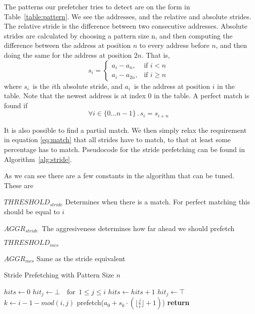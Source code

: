 The patterns our prefetcher tries to detect are on the form in
Table~\ref{table:pattern}.
We see the addresses, and the relative and absolute strides.
The relative stride is the difference between two consecutive
addresses.
Absolute strides are calculated by choosing a pattern size n,
and then computing the difference between the address at position
$n$ to every address before $n$, and then doing the same for the address
at position $2n$.
That is,
\[
	s_i = \begin{cases}
		a_i - a_n,    & \text{if } i  < n \\%
		a_i - a_{2n}, & \text{if } i \geq n %
	\end{cases}
\]
where $s_i$~is the $i$th absolute stride, and $a_i$~is the address at position
$i$ in the table. Note that the newest address is at index 0 in the table. A
perfect match is found if
\begin{equation}
\label{eq:match}
\forall i \in \{0 \dots n - 1\} \,.\, s_i = s_{i + n}
\end{equation}

It is also possible to find a partial match. We then simply relax the
requirement in equation \eqref{eq:match} that all strides have to match, to
that at least some percentage has to match. Pseudocode for the stride
prefetching can be found in Algorithm~\ref{alg:stride}.

As we can see there are a few constants in the algorithm that can be
tuned. These are

\begin{description}
	\item{$THRESHOLD_{stride}$} Determines when there is a match. For perfect
	matching this should be equal to $i$
	\item{$AGGR_{stride}$} The aggresiveness determines how far ahead we should
	prefetch
	\item{$THRESHOLD_{mcs}$}
	\item{$AGGR_{mcs}$} Same as the stride equivalent
\end{description}


\begin{algorithm}
	\caption{Stride Prefetching with Pattern Size $n$}
	\label{alg:stride}
	\begin{algorithmic}
			\State $hits \gets 0$
			\State $hit_j \gets \bot \quad \text{for } \, 1 \leq j \leq i$
					\State $hits \gets hits + 1$
					\State $hit_j \gets \top$
				\EndIf
			\EndFor
				\State $k \gets i - 1 - mod(i,j)$
					\State prefetch($a_0 + s_k \cdot (\lfloor \frac{j}{i} \rfloor + 1)$)
					\EndIf
				\EndFor
				\State \bfseries return
			\EndIf
		\EndFor
	\end{algorithmic}
\end{algorithm}

